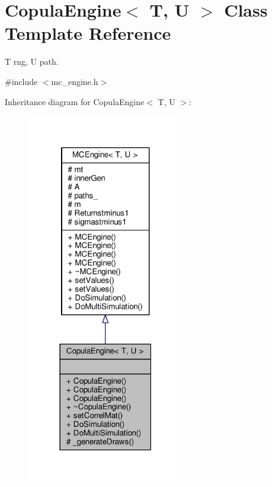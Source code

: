 \hypertarget{classCopulaEngine}{}\section{Copula\+Engine$<$ T, U $>$ Class Template Reference}
\label{classCopulaEngine}


T rng, U path.  




{\ttfamily \#include $<$mc\+\_\+engine.\+h$>$}



Inheritance diagram for Copula\+Engine$<$ T, U $>$\+:
\nopagebreak
\begin{figure}[H]
\begin{center}
\leavevmode
\includegraphics[width=195pt]{classCopulaEngine__inherit__graph}
\end{center}
\end{figure}


